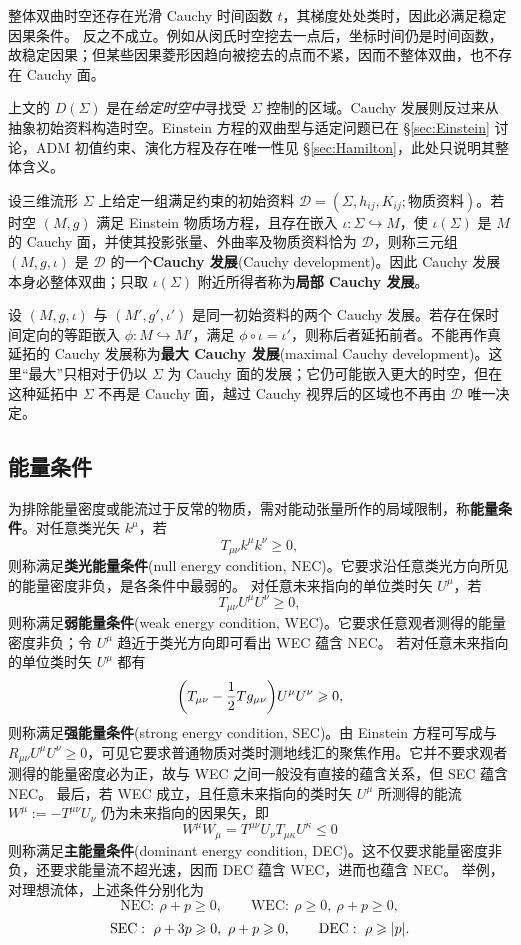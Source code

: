 整体双曲时空还存在光滑 Cauchy 时间函数 $t$，其梯度处处类时，因此必满足稳定因果条件。
反之不成立。例如从闵氏时空挖去一点后，坐标时间仍是时间函数，故稳定因果；但某些因果菱形因趋向被挖去的点而不紧，因而不整体双曲，也不存在 Cauchy 面。

上文的 $D(\Sigma)$ 是在\textit{给定时空中}寻找受 $\Sigma$ 控制的区域。Cauchy 发展则反过来从抽象初始资料构造时空。Einstein 方程的双曲型与适定问题已在 \S\ref{sec:Einstein} 讨论，ADM 初值约束、演化方程及存在唯一性见 \S\ref{sec:Hamilton}，此处只说明其整体含义。

设三维流形 $\Sigma$ 上给定一组满足约束的初始资料 $\mathcal D=(\Sigma,h_{ij},K_{ij};\text{物质资料})$。若时空 $(M,g)$ 满足 Einstein 物质场方程，且存在嵌入 $\iota:\Sigma\hookrightarrow M$，使 $\iota(\Sigma)$ 是 $M$ 的 Cauchy 面，并使其投影张量、外曲率及物质资料恰为 $\mathcal D$，则称三元组 $(M,g,\iota)$ 是 $\mathcal D$ 的一个\textbf{Cauchy 发展}(Cauchy development)。因此 Cauchy 发展本身必整体双曲；只取 $\iota(\Sigma)$ 附近所得者称为\textbf{局部 Cauchy 发展}。

设 $(M,g,\iota)$ 与 $(M',g',\iota')$ 是同一初始资料的两个 Cauchy 发展。若存在保时间定向的等距嵌入 $\phi:M\hookrightarrow M'$，满足 $\phi\circ\iota=\iota'$，则称后者延拓前者。不能再作真延拓的 Cauchy 发展称为\textbf{最大 Cauchy 发展}(maximal Cauchy development)。这里“最大”只相对于仍以 $\Sigma$ 为 Cauchy 面的发展；它仍可能嵌入更大的时空，但在这种延拓中 $\Sigma$ 不再是 Cauchy 面，越过 Cauchy 视界后的区域也不再由 $\mathcal D$ 唯一决定。



\subsection{能量条件}
为排除能量密度或能流过于反常的物质，需对能动张量所作的局域限制，称\textbf{能量条件}。对任意类光矢 $k^\mu$，若
\[
    T_{\mu\nu}k^\mu k^\nu\geqslant 0,
\]
则称满足\textbf{类光能量条件}(null energy condition, NEC)。它要求沿任意类光方向所见的能量密度非负，是各条件中最弱的。
对任意未来指向的单位类时矢 $U^\mu$，若
\[
    T_{\mu\nu}U^\mu U^\nu\geqslant 0,
\]
则称满足\textbf{弱能量条件}(weak energy condition, WEC)。它要求任意观者测得的能量密度非负；令 $U^\mu$ 趋近于类光方向即可看出 WEC 蕴含 NEC。
若对任意未来指向的单位类时矢 $U^\mu$ 都有
\[
    \qty(T_{\mu\nu}-\frac{1}{2}Tg_{\mu\nu})U^\mu U^\nu\geqslant 0,
\]
则称满足\textbf{强能量条件}(strong energy condition, SEC)。由 Einstein 方程可写成与 $R_{\mu\nu}U^\mu U^\nu\geqslant 0$，可见它要求普通物质对类时测地线汇的聚焦作用。它并不要求观者测得的能量密度必为正，故与 WEC 之间一般没有直接的蕴含关系，但 SEC 蕴含 NEC。
最后，若 WEC 成立，且任意未来指向的类时矢 $U^\mu$ 所测得的能流 $W^\mu := -T^{\mu\nu} U_\nu$ 仍为未来指向的因果矢，即
\[W^\mu W_\mu = T^{\mu\nu} U_\nu T_{\mu\kappa} U^\kappa\leqslant 0\]
则称满足\textbf{主能量条件}(dominant energy condition, DEC)。这不仅要求能量密度非负，还要求能量流不超光速，因而 DEC 蕴含 WEC，进而也蕴含 NEC。
举例，对理想流体，上述条件分别化为
\[
    \mathrm{NEC}:\ \rho+p\geqslant0,\qquad
    \mathrm{WEC}:\ \rho\geqslant0,\ \rho+p\geqslant0,
\]
\[
    \mathrm{SEC}:\ \rho+3p\geqslant0,\ \rho+p\geqslant0,\qquad
    \mathrm{DEC}:\ \rho\geqslant\abs{p}.
\]

